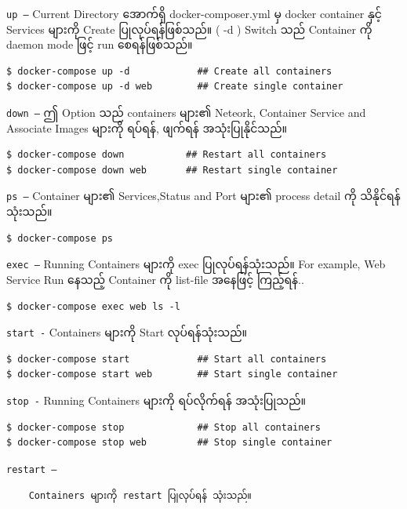 \texttt{up\ –} Current Directory အောက်ရှိ docker-composer.yml မှ docker
container နှင့် Services များကို Create ပြုလုပ်ရန်ဖြစ်သည်။ ( -d ) Switch
သည် Container ကို daemon mode ဖြင့် run စေရန်ဖြစ်သည်။

\begin{verbatim}
$ docker-compose up -d            ## Create all containers
$ docker-compose up -d web        ## Create single container
\end{verbatim}

\texttt{down\ –} ဤ Option သည် containers များ၏ Neteork, Container
Service and Associate Images များကို ရပ်ရန်, ဖျက်ရန် အသုံးပြုနိုင်သည်။

\begin{verbatim}
$ docker-compose down           ## Restart all containers
$ docker-compose down web       ## Restart single container
\end{verbatim}

\texttt{ps\ –} Container များ၏ Services,Status and Port များ၏ process
detail ကို သိနိုင်ရန် သုံးသည်။

\begin{verbatim}
$ docker-compose ps
\end{verbatim}

\texttt{exec\ –} Running Containers များကို exec ပြုလုပ်ရန်သုံးသည်။ For
example, Web Service Run နေသည့် Container ကို list-file အနေဖြင့်
ကြည့်ရန်..

\begin{verbatim}
$ docker-compose exec web ls -l
\end{verbatim}

\texttt{start\ -} Containers များကို Start လုပ်ရန်သုံးသည်။

\begin{verbatim}
$ docker-compose start            ## Start all containers
$ docker-compose start web        ## Start single container
\end{verbatim}

\texttt{stop\ -} Running Containers များကို ရပ်လိုက်ရန် အသုံးပြုသည်။

\begin{verbatim}
$ docker-compose stop             ## Stop all containers
$ docker-compose stop web         ## Stop single container
\end{verbatim}

\texttt{restart\ –}

\begin{verbatim}
    Containers များကို restart ပြုလုပ်ရန် သုံးသည်။
\end{verbatim}


